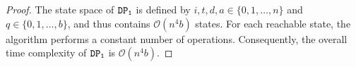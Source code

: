 \documentclass[10pt,a4paper]{amsart}
\newcommand{\capacity}{b}
\newcommand{\firstDP}{{\tt DP_1}}
\begin{document}
\begin{proof}
\smallskip

The state space of $\firstDP$ is defined by
$i,t,d,a \in \{0,1,\dots,n\}$ and $q \in \{0,1,\dots,\capacity\}$, and thus contains
$\mathcal{O}(n^4 \capacity)$ states. 
For each reachable state, the algorithm performs a
constant number of operations. 
Consequently, the overall time complexity of $\firstDP$ is $\mathcal{O}(n^4 \capacity)$.
\end{proof}
\end{document}
